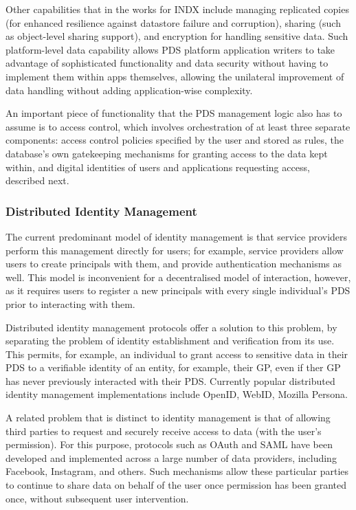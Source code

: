 \documentclass[graybox]{svmult}
\begin{document}
Other capabilities that in the works for INDX include managing replicated copies (for enhanced resilience against datastore failure and corruption), sharing (such as object-level sharing support), and encryption for handling sensitive data.  Such platform-level data capability allows PDS platform application writers to take advantage of sophisticated functionality and data security without having to implement them within apps themselves, allowing the unilateral improvement of data handling without adding application-wise complexity.

An important piece of functionality that the PDS management logic also has to assume is to access control, which involves orchestration of at least three separate components: access control policies specified by the user and stored as rules,  the database’s own gatekeeping mechanisms for granting access to the data kept within, and digital identities of users and applications requesting access, described next.

\subsubsection{Distributed Identity Management}
The current predominant model of identity management is that service providers perform this management directly for users; for example, service providers allow users to create principals with them, and provide authentication mechanisms as well.  This model is inconvenient for a decentralised model of interaction, however, as it requires users to register a new principals with every single individual’s PDS prior to interacting with them.

Distributed identity management protocols \cite{koshutanski2007distributed} offer a solution to this problem, by separating the problem of identity establishment and verification from its use.  This permits, for example, an individual to grant access to sensitive data in their PDS to a verifiable identity of an entity, for example, their GP, even if ther GP has never previously interacted with their PDS.  Currently popular distributed identity management implementations include OpenID\cite{recordon2006openid}, WebID\cite{huang2000webid}, Mozilla Persona\cite{williams2013sasl}.

A related problem that is distinct to identity management is that of allowing third parties to request and securely receive access to data (with the user’s permission).  For this purpose, protocols such as OAuth\cite{hardt2012oauth} and SAML\cite{armando2008formal} have been developed and implemented across a large number of data providers, including Facebook, Instagram, and others.  Such mechanisms allow these particular parties to continue to share data on behalf of the user once permission has been granted once, without subsequent user intervention.  
\end{document}
